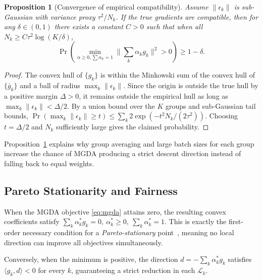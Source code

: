 \documentclass[conference]{IEEEtran}
\newtheorem{proposition}{Proposition}
\begin{document}
\begin{proposition}[Convergence of empirical compatibility]
\label{prop:compat}
Assume $\|\epsilon_k\|$ is sub-Gaussian with variance proxy $\tau^2/N_k$.
If the true gradients are compatible, then for any $\delta\in(0,1)$ there exists a constant $C>0$ such that
when all $N_k \ge C\tau^2 \log(K/\delta)$,
\[
\Pr\left( \min_{\alpha\ge 0,\sum\alpha_k=1} \big\|\sum_k \alpha_k g_k\big\|^2 > 0 \right) \ge 1-\delta.
\]
\end{proposition}
\begin{proof}
The convex hull of $\{g_k\}$ is within the Minkowski sum of the convex hull of $\{\bar{g}_k\}$ and a ball of radius $\max_k\|\epsilon_k\|$.
Since the origin is outside the true hull by a positive margin $\Delta>0$, it remains outside the empirical hull as long as
$\max_k\|\epsilon_k\| < \Delta/2$.
By a union bound over the $K$ groups and sub-Gaussian tail bounds,
$\Pr(\max_k\|\epsilon_k\| \ge t) \le \sum_k 2\exp(-t^2 N_k/(2\tau^2))$.
Choosing $t=\Delta/2$ and $N_k$ sufficiently large gives the claimed probability.
\end{proof}

Proposition~\ref{prop:compat} explains why group averaging and large batch sizes for each group increase the chance of MGDA producing a strict descent direction instead of falling back to equal weights.

\subsection{Pareto Stationarity and Fairness}
When the MGDA objective \eqref{eq:mgda} attains zero, the resulting convex coefficients satisfy
$\sum_k \alpha_k^* g_k = 0,\ \alpha_k^*\ge 0,\ \sum_k \alpha_k^*=1$.
This is exactly the first-order necessary condition for a \emph{Pareto-stationary} point~\cite{desideri2012multiple},
meaning no local direction can improve all objectives simultaneously.

Conversely, when the minimum is positive, the direction $d = -\sum_k \alpha_k^* g_k$ satisfies
$\langle g_k, d\rangle < 0$ for every $k$, guaranteeing a strict reduction in each $\mathcal{L}_k$.
\end{document}
